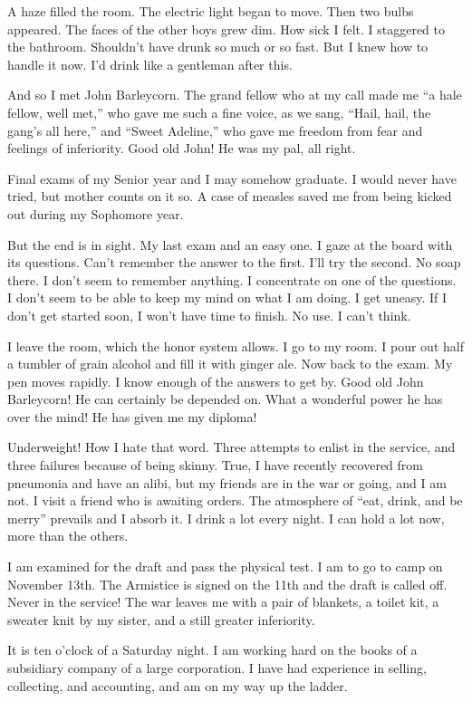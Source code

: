 A haze filled the room. The electric light began to move. Then two bulbs appeared. The faces of the other boys grew dim. How sick I felt. I staggered to the bathroom. Shouldn’t have drunk so much or so fast. But I knew how to handle it now. I’d drink like a gentleman after this.

And so I met John Barleycorn. The grand fellow who at my call made me “a hale fellow, well met,” who gave me such a fine voice, as we sang, “Hail, hail, the gang’s all here,” and “Sweet Adeline,” who gave me freedom from fear and feelings of inferiority. Good old John! He was my pal, all right.

      Final exams of my Senior year and I may somehow graduate. I would never have tried, but mother counts on it so. A case of measles saved me from being kicked out during my Sophomore year.

But the end is in sight. My last exam and an easy one. I gaze at the board with its questions. Can’t remember the answer to the first. I’ll try the second. No soap there. I don’t seem to remember anything. I concentrate on one of the questions. I don’t seem to be able to keep my mind on what I am doing. I get uneasy. If I don’t get started soon, I won’t have time to finish. No use. I can’t think.

I leave the room, which the honor system allows. I go to my room. I pour out half a tumbler of grain alcohol and fill it with ginger ale. Now back to the exam. My pen moves rapidly. I know enough of the answers to get by. Good old John Barleycorn! He can certainly be depended on. What a wonderful power he has over the mind! He has given me my diploma!

Underweight! How I hate that word. Three attempts to enlist in the service, and three failures because of being skinny. True, I have recently recovered from pneumonia and have an alibi, but my friends are in the war or going, and I am not. I visit a friend who is awaiting orders. The atmosphere of “eat, drink, and be merry” prevails and I absorb it. I drink a lot every night. I can hold a lot now, more than the others.

I am examined for the draft and pass the physical test. I am to go to camp on November 13th. The Armistice is signed on the 11th and the draft is called off. Never in the service! The war leaves me with a pair of blankets, a toilet kit, a sweater knit by my sister, and a still greater inferiority.

      It is ten o’clock of a Saturday night. I am working hard on the books of a subsidiary company of a large corporation. I have had experience in selling, collecting, and accounting, and am on my way up the ladder.

